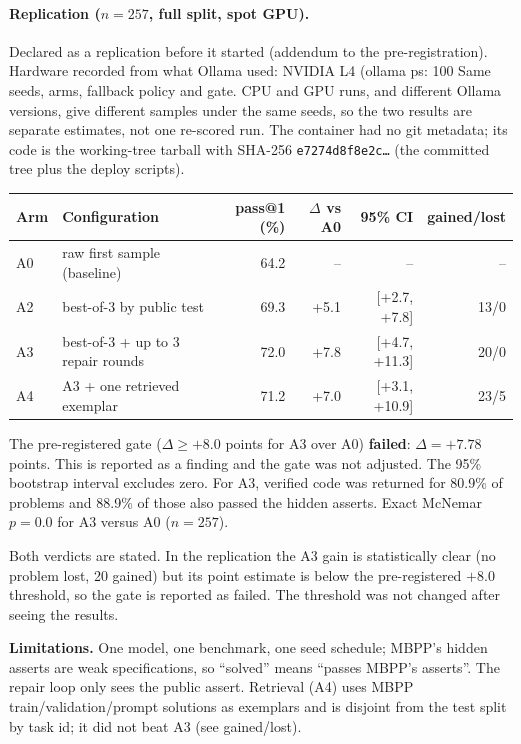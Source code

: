 \paragraph{Replication ($n=257$, full split, spot GPU).}
Declared as a replication before it started (addendum to the pre-registration). Hardware recorded from
what Ollama used: NVIDIA L4 (ollama ps: 100%
Same seeds, arms, fallback policy and gate. CPU and GPU runs, and different Ollama versions, give
different samples under the same seeds, so the two results are separate estimates, not one re-scored run.
The container had no git metadata; its code is the working-tree tarball with SHA-256
\texttt{e7274d8f8e2c\ldots} (the committed tree plus the deploy scripts).



\begin{center}\small
\begin{tabular}{llrrrr}\toprule
Arm & Configuration & pass@1 (\%) & $\Delta$ vs A0 & 95\% CI & gained/lost \\\midrule
A0 & raw first sample (baseline) & 64.2 & -- & -- & -- \\
A2 & best-of-3 by public test & 69.3 & +5.1 & [+2.7, +7.8] & 13/0 \\
A3 & best-of-3 + up to 3 repair rounds & 72.0 & +7.8 & [+4.7, +11.3] & 20/0 \\
A4 & A3 + one retrieved exemplar & 71.2 & +7.0 & [+3.1, +10.9] & 23/5 \\
\bottomrule\end{tabular}
\end{center}

The pre-registered gate ($\Delta \ge +8.0$ points for A3 over A0) \textbf{failed}: $\Delta = +7.78$ points. This is reported as a finding and the gate was not adjusted. The 95\% bootstrap interval excludes zero. For A3, verified code was returned for 80.9\% of problems and
88.9\% of those also passed the hidden asserts.
Exact McNemar $p = 0.0$ for A3 versus A0 ($n=257$).

Both verdicts are stated. In the replication the A3 gain is statistically clear (no problem lost, 20 gained)
but its point estimate is below the pre-registered $+8.0$ threshold, so the gate is reported as failed.
The threshold was not changed after seeing the results.

\textbf{Limitations.} One model, one benchmark, one seed schedule; MBPP's hidden asserts are weak
specifications, so ``solved'' means ``passes MBPP's asserts''. The repair loop only sees the public assert.
Retrieval (A4) uses MBPP train/validation/prompt solutions as exemplars and is disjoint from the test split by task id;
it did not beat A3 (see gained/lost).
